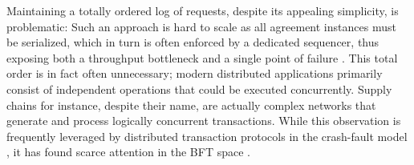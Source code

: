 


\fi
\iffalse
Maintaining a totally ordered log of requests, despite its appealing simplicity, is problematic:
Such an approach is hard to scale  as all agreement instances must be serialized, which in turn is often enforced by a dedicated sequencer, thus exposing both a throughput bottleneck and a single point of failure . This total order is in fact often unnecessary; modern distributed applications primarily consist of independent operations that could be executed concurrently. Supply chains for instance, despite their name, are actually complex networks that generate and process logically concurrent transactions. 
While this observation is frequently leveraged by distributed transaction protocols in the crash-fault model \cite{a bunch}, it has found scarce \cite{Clairvoyant} attention in the BFT space .

